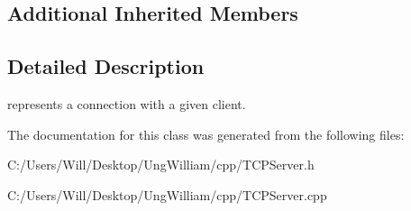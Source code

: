 \subsection*{Additional Inherited Members}


\subsection{Detailed Description}
represents a connection with a given client. 

The documentation for this class was generated from the following files\+:\begin{DoxyCompactItemize}
\item 
C\+:/\+Users/\+Will/\+Desktop/\+Ung\+William/cpp/T\+C\+P\+Server.\+h\item 
C\+:/\+Users/\+Will/\+Desktop/\+Ung\+William/cpp/T\+C\+P\+Server.\+cpp\end{DoxyCompactItemize}
